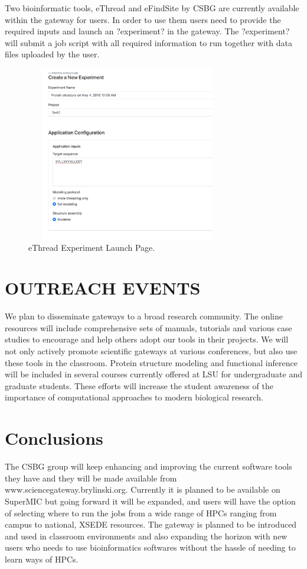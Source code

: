 \documentclass[sigconf]{acmart}
\begin{document}
Two bioinformatic tools, eThread and eFindSite by CSBG are currently available within the gateway for users. In order to use them users need to provide the required inputs and launch an ?experiment? in the gateway. The ?experiment? will submit a job script with all required information to run together with data files uploaded by the user. 

\begin{figure}
\includegraphics[height=3in, width=3.5in]{Fig3-experiment-launch.png}
\caption{eThread Experiment Launch Page.}
\end{figure}

\section{OUTREACH EVENTS}

We plan to disseminate gateways to a broad research community. The online resources will include comprehensive sets of manuals, tutorials and various case studies to encourage and help others adopt our tools in their projects. We will not only actively promote scientific gateways at various conferences, but also use these tools in the classroom. Protein structure modeling and functional inference will be included in several courses currently offered at LSU for undergraduate and graduate students. These efforts will increase the student awareness of the importance of computational approaches to modern biological research.

\section{Conclusions}
The CSBG group will keep enhancing and improving the current software tools they have and they will be made available from www.sciencegateway.brylinski.org. Currently it is planned to be available on SuperMIC but going forward it will be expanded, and users will have the option of selecting where to run the jobs from a wide range of HPCs ranging from campus to national, XSEDE resources. The gateway is planned to be introduced and used in classroom environments and also expanding the horizon with new users who needs to use bioinformatics softwares without the hassle of needing to learn ways of HPCs. 
\end{document}
